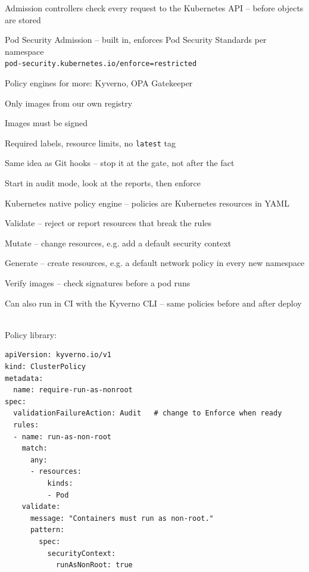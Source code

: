 \documentclass[Screen16to9,17pt]{foils}
\begin{document}
\begin{list2}
\item Admission controllers check every request to the Kubernetes API -- before objects are stored
\item Pod Security Admission -- built in, enforces Pod Security Standards per namespace\\
\verb+pod-security.kubernetes.io/enforce=restricted+
\item Policy engines for more: Kyverno, OPA Gatekeeper
\begin{list2}
\item Only images from our own registry
\item Images must be signed
\item Required labels, resource limits, no \verb+latest+ tag
\end{list2}
\item Same idea as Git hooks -- stop it at the gate, not after the fact
\item Start in audit mode, look at the reports, then enforce
\end{list2}




\begin{list2}
\item Kubernetes native policy engine -- policies are Kubernetes resources in YAML
\item Validate -- reject or report resources that break the rules
\item Mutate -- change resources, e.g. add a default security context
\item Generate -- create resources, e.g. a default network policy in every new namespace
\item Verify images -- check signatures before a pod runs
\item Can also run in CI with the Kyverno CLI -- same policies before and after deploy
\end{list2}

{\footnotesize{}\\
Policy library: }



\begin{verbatim}
apiVersion: kyverno.io/v1
kind: ClusterPolicy
metadata:
  name: require-run-as-nonroot
spec:
  validationFailureAction: Audit   # change to Enforce when ready
  rules:
  - name: run-as-non-root
    match:
      any:
      - resources:
          kinds:
          - Pod
    validate:
      message: "Containers must run as non-root."
      pattern:
        spec:
          securityContext:
            runAsNonRoot: true
\end{verbatim}
\end{document}
